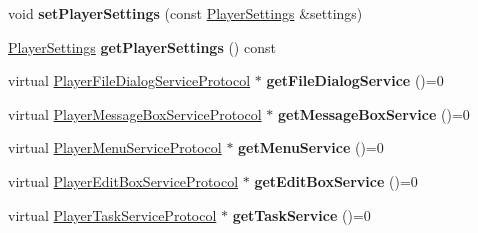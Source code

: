 \begin{DoxyCompactItemize}
void {\bfseries set\+Player\+Settings} (const \hyperlink{classPlayerSettings}{Player\+Settings} \&settings)
\item 
\mbox{\label{classPlayerProtocol_a33a9c0f7ce946b15ab35bf13aeb68474}} 
\hyperlink{classPlayerSettings}{Player\+Settings} {\bfseries get\+Player\+Settings} () const
\item 
\mbox{\label{classPlayerProtocol_a7fb93f90d1e777b75dbba6fc3b07e570}} 
virtual \hyperlink{classPlayerFileDialogServiceProtocol}{Player\+File\+Dialog\+Service\+Protocol} $\ast$ {\bfseries get\+File\+Dialog\+Service} ()=0
\item 
\mbox{\label{classPlayerProtocol_af8399c97054bafafb940f29ee9d4be07}} 
virtual \hyperlink{classPlayerMessageBoxServiceProtocol}{Player\+Message\+Box\+Service\+Protocol} $\ast$ {\bfseries get\+Message\+Box\+Service} ()=0
\item 
\mbox{\label{classPlayerProtocol_ad5bfa6f2de72649d8a3b7d66d894293b}} 
virtual \hyperlink{classPlayerMenuServiceProtocol}{Player\+Menu\+Service\+Protocol} $\ast$ {\bfseries get\+Menu\+Service} ()=0
\item 
\mbox{\label{classPlayerProtocol_a933a1df6410b68d153aea4a45567006b}} 
virtual \hyperlink{classPlayerEditBoxServiceProtocol}{Player\+Edit\+Box\+Service\+Protocol} $\ast$ {\bfseries get\+Edit\+Box\+Service} ()=0
\item 
\mbox{\label{classPlayerProtocol_aa3889039ec327dfa277e463cef26d2a4}} 
virtual \hyperlink{classPlayerTaskServiceProtocol}{Player\+Task\+Service\+Protocol} $\ast$ {\bfseries get\+Task\+Service} ()=0
\end{DoxyCompactItemize}
